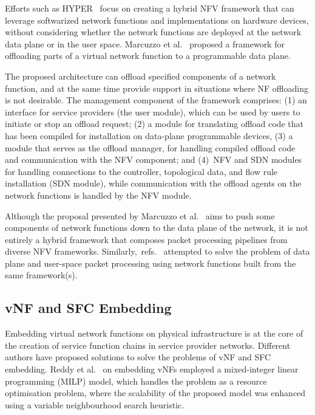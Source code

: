 \documentclass[futureinternet,review,accept,pdftex,moreauthors]{Definitions/mdpi}
\begin{document}
Efforts such as HYPER~\cite{sun2017hyper} focus on creating a hybrid NFV framework that can leverage softwarized network functions and implementations on hardware devices, without  considering whether the network functions are deployed at the network data plane or in the user space. Marcuzzo {et al.}~\cite{marcuzzo2020enabling} proposed a framework for offloading parts of a virtual network function to a programmable data plane. 

The proposed architecture can offload specified components of a network function, and at the same time provide support in situations where NF offloading is not desirable. The management component of the framework comprises: (1) an interface for service providers (the user module), which can be used by users to initiate or stop an offload request; (2) a module for translating offload code that has been compiled for installation on data-plane programmable devices, (3) a module that serves as the offload manager, for handling compiled offload code and communication with the NFV component; and (4)~NFV and SDN modules for handling connections to the controller, topological data, and flow rule installation (SDN module), while communication with the offload agents on the network functions is handled by the NFV module.

Although the proposal presented by Marcuzzo {et al.}~\cite{marcuzzo2020enabling} aims to push some components of network functions down to the data plane of the network, it is not entirely a hybrid framework that composes packet processing pipelines from diverse NFV frameworks. Similarly,~refs.~\cite{sun2017hyper,van2017architecture,van2019building} attempted to solve the problem of data plane and user-space packet processing using network functions built from the same framework(s).



\subsection{vNF and SFC Embedding}
\label{VNF Embedding}
Embedding virtual network functions on physical infrastructure is at the core of the creation of service function chains in service provider networks. Different authors have proposed solutions to solve the problems of vNF and SFC embedding. Reddy {et al.}~\cite{reddy2016robust} on embedding vNFs employed a mixed-integer linear programming (MILP) model, which handles the problem as a resource optimisation problem, where the scalability of the proposed model was enhanced using a variable neighbourhood search heuristic. 
\end{document}
